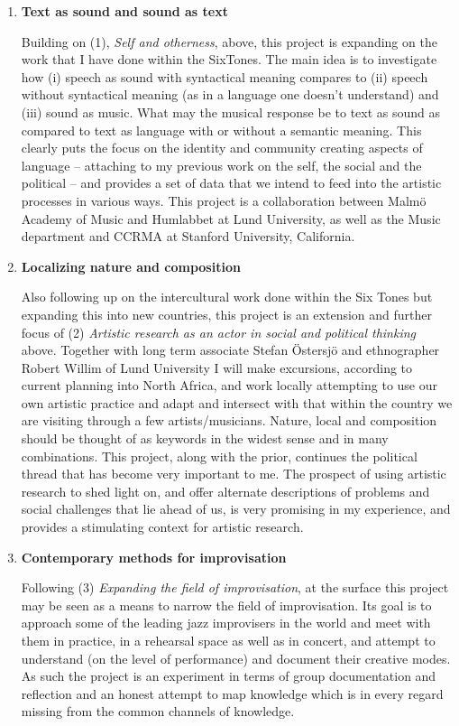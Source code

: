 \documentclass[a4paper]{article}
\begin{document}
\begin{enumerate}[label=(\emph{\alph*})]
\item \textbf{Text as sound and sound as text} 

Building on (1), \emph{Self and otherness}, above, this project is expanding on the work that I have done within the SixTones. The main idea is to investigate how (i) speech as sound with syntactical meaning compares to (ii) speech without syntactical meaning (as in a language one doesn't understand) and (iii) sound as music. What may the musical response be to text as sound as compared to text as language with or without a semantic meaning. This clearly puts the focus on the identity and community creating aspects of language -- attaching to my previous work on the self, the social and the political -- and provides a set of data that we intend to feed into the artistic processes in various ways. This project is a collaboration between Malmö Academy of Music and Humlabbet at Lund University, as well as the Music department and CCRMA at Stanford University, California.

\item \textbf{Localizing nature and composition} 

Also following up on the intercultural work done within the Six Tones but expanding this into new countries, this project is an extension and further focus of (2) \emph{Artistic research as an actor in social and political thinking} above. Together with long term associate Stefan Östersjö and ethnographer Robert Willim of Lund University I will make excursions, according to current planning into North Africa, and work locally attempting to use our own artistic practice and adapt and intersect with that within the country we are visiting through a few artists/musicians. Nature, local and composition should be thought of as keywords in the widest sense and in many combinations. This project, along with the prior, continues the political thread that has become very important to me. The prospect of using artistic research to shed light on, and offer alternate descriptions of problems and social challenges that lie ahead of us, is very promising in my experience, and provides a stimulating context for artistic research.

\item \textbf{Contemporary methods for improvisation} 

Following (3) \emph{Expanding the field of improvisation}, at the surface this project may be seen as a means to narrow the field of improvisation. Its goal is to approach some of the leading jazz improvisers in the world and meet with them in practice, in a rehearsal space as well as in concert, and attempt to understand (on the level of performance) and document their creative modes. As such the project is an experiment in terms of group documentation and reflection and an honest attempt to map knowledge which is in every regard missing from the common channels of knowledge.


\end{enumerate}
\end{document}
